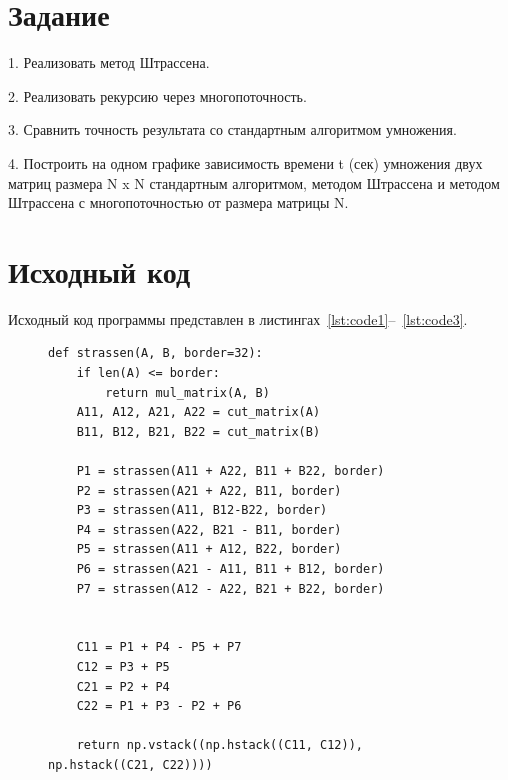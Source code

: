 \documentclass[a4paper, 14pt]{extarticle}
\begin{document}
\renewcommand{\ttdefault}{pcr}

\setlength{\tabcolsep}{3pt}
\newpage
\setcounter{page}{2}

\section{Задание}\label{Sect::task}
1. Реализовать метод Штрассена.

2. Реализовать рекурсию через многопоточность.

3. Сравнить точность результата со стандартным алгоритмом умножения.

4. Построить на одном графике зависимость времени t (сек) умножения двух матриц размера N x N стандартным алгоритмом, методом Штрассена и методом Штрассена с многопоточностью от размера матрицы N.
\newpage
\section{Исходный код}

Исходный код программы представлен в листингах~\ref{lst:code1}--~\ref{lst:code3}.

\begin{figure}[H]
\begin{lstlisting}[language={},caption={Реализация метода Штрассена},label={lst:code1}]
def strassen(A, B, border=32):
    if len(A) <= border:
        return mul_matrix(A, B)
    A11, A12, A21, A22 = cut_matrix(A)
    B11, B12, B21, B22 = cut_matrix(B)

    P1 = strassen(A11 + A22, B11 + B22, border)
    P2 = strassen(A21 + A22, B11, border)
    P3 = strassen(A11, B12-B22, border)
    P4 = strassen(A22, B21 - B11, border)
    P5 = strassen(A11 + A12, B22, border)
    P6 = strassen(A21 - A11, B11 + B12, border)
    P7 = strassen(A12 - A22, B21 + B22, border)


    C11 = P1 + P4 - P5 + P7
    C12 = P3 + P5
    C21 = P2 + P4
    C22 = P1 + P3 - P2 + P6

    return np.vstack((np.hstack((C11, C12)), np.hstack((C21, C22))))
\end{lstlisting}
\end{figure}
\end{document}
